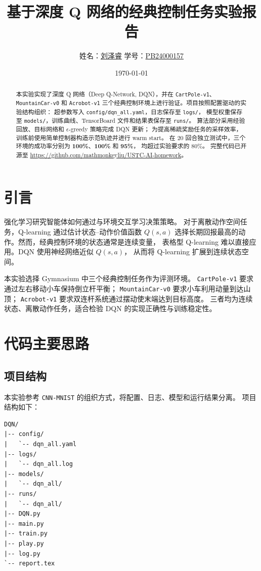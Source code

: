 \documentclass[UTF8,a4paper,12pt]{ctexart}
\title{基于深度 Q 网络的经典控制任务实验报告}
\author{姓名：\underline{刘泽睿} \quad 学号：\underline{PB24000157}}
\date{\today}
\begin{document}
\maketitle

\begin{abstract}
本实验实现了深度 Q 网络（Deep Q-Network, DQN），并在
\texttt{CartPole-v1}、\texttt{MountainCar-v0} 和 \texttt{Acrobot-v1}
三个经典控制环境上进行验证。项目按照配置驱动的实验结构组织：
超参数写入 \texttt{config/dqn\_all.yaml}，日志保存至 \texttt{logs/}，
模型权重保存至 \texttt{models/}，训练曲线、TensorBoard 文件和结果表保存至 \texttt{runs/}。
算法部分采用经验回放、目标网络和 $\epsilon$-greedy 策略完成 DQN 更新；
为提高稀疏奖励任务的采样效率，训练前使用简单控制器构造示范轨迹并进行 warm start。
在 20 回合独立测试中，三个环境的成功率分别为
\textbf{100\%}、\textbf{100\%} 和 \textbf{95\%}，
均超过实验要求的 80\%。
完整代码已开源至 \url{https://github.com/mathmonkeyliu/USTC-AI-homework}。
\end{abstract}

\tableofcontents

\section{引言}

强化学习研究智能体如何通过与环境交互学习决策策略。
对于离散动作空间任务，Q-learning 通过估计状态--动作价值函数 $Q(s,a)$
选择长期回报最高的动作。然而，经典控制环境的状态通常是连续变量，
表格型 Q-learning 难以直接应用。DQN 使用神经网络近似 $Q(s,a)$，
从而将 Q-learning 扩展到连续状态空间。

本实验选择 Gymnasium 中三个经典控制任务作为评测环境。
\texttt{CartPole-v1} 要求通过左右移动小车保持倒立杆平衡；
\texttt{MountainCar-v0} 要求小车利用动量到达山顶；
\texttt{Acrobot-v1} 要求双连杆系统通过摆动使末端达到目标高度。
三者均为连续状态、离散动作任务，适合检验 DQN 的实现正确性与训练稳定性。

\section{代码主要思路}

\subsection{项目结构}

本实验参考 \texttt{CNN-MNIST} 的组织方式，将配置、日志、模型和运行结果分离。
项目结构如下：

\begin{verbatim}
DQN/
|-- config/
|   `-- dqn_all.yaml
|-- logs/
|   `-- dqn_all.log
|-- models/
|   `-- dqn_all/
|-- runs/
|   `-- dqn_all/
|-- DQN.py
|-- main.py
|-- train.py
|-- play.py
|-- log.py
`-- report.tex
\end{verbatim}
\end{document}
